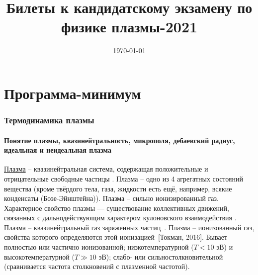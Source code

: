 \documentclass[10pt, a4paper]{article}
\title{Билеты к кандидатскому экзамену по физике плазмы-2021}
\date{\today}
\newcommand{\Tokman}{~[Токман, 2016]}
\let\stdsection\section
\renewcommand\section{\newpage\stdsection}
\let\stdpart\part
\renewcommand{\part}{\newpage\stdpart}
\begin{document}
\maketitle

\tableofcontents

\part{Программа-минимум}

\section{Термодинамика плазмы}

\subsection{Понятие плазмы, квазинейтральность, микрополя, дебаевский радиус, идеальная и неидеальная плазма}

\uline{Плазма} -- квазинейтральная система, содержащая положительные и отрицательные свободные частицы \cite{frank}. Плазма -- одно из 4 агрегатных состояний вещества (кроме твёрдого тела, газа, жидкости есть ещё, например, всякие конденсаты (Бозе-Эйнштейна)). Плазма -- сильно ионизированный газ. Характерное свойство плазмы — существование коллективных
движений, связанных с дальнодействующим характером кулоновского взаимодействия \cite{kroll}. Плазма -- квазинейтральный газ заряженных частиц~\cite{kotelnikov}. Плазма -- ионизованный газ, свойства которого определяются этой ионизацией\Tokman. Бывает полностью или частично ионизованной; низкотемпературной ($T<10$ эВ) и высокотемпературной ($T\gg10$ эВ); слабо- или сильностолкновительной (сравнивается частота столкновений с плазменной частотой).
\end{document}
